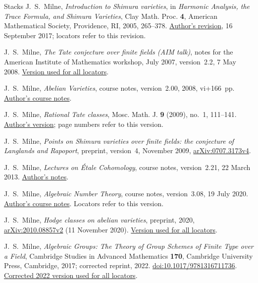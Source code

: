 \begin{thebibliography}{Stacks}
J.~S.~Milne,
\emph{Introduction to Shimura varieties},
in \emph{Harmonic Analysis, the Trace Formula, and Shimura Varieties},
Clay Math. Proc. \textbf{4}, American Mathematical Society,
Providence, RI, 2005, 265--378.
\href{https://www.jmilne.org/math/xnotes/svi.pdf}{Author's revision},
16 September 2017; locators refer to this revision.

J.~S.~Milne,
\emph{The Tate conjecture over finite fields (AIM talk)},
notes for the American Institute of Mathematics workshop, July 2007,
version~2.2, 7 May 2008.
\href{https://www.jmilne.org/math/articles/2007e.pdf}{Version used for all locators}.

J.~S.~Milne,
\emph{Abelian Varieties}, course notes, version~2.00, 2008, vi+166~pp.
\href{https://www.jmilne.org/math/CourseNotes/AVc.pdf}{Author's course notes}.

J.~S.~Milne,
\emph{Rational Tate classes},
Mosc. Math. J. \textbf{9} (2009), no.~1, 111--141.
\href{https://www.jmilne.org/math/articles/2009b.pdf}{Author's version};
page numbers refer to this version.

J.~S.~Milne,
\emph{Points on Shimura varieties over finite fields: the conjecture of
Langlands and Rapoport},
preprint, version~4, November 2009,
\href{https://arxiv.org/abs/0707.3173v4}{arXiv:0707.3173v4}.

J.~S.~Milne,
\emph{Lectures on \'{E}tale Cohomology},
course notes, version~2.21, 22 March 2013.
\href{https://www.jmilne.org/math/CourseNotes/LEC.pdf}{Author's notes}.

J.~S.~Milne,
\emph{Algebraic Number Theory}, course notes, version~3.08, 19 July 2020.
\href{https://www.jmilne.org/math/CourseNotes/ANTc.pdf}{Author's course notes}.
Locators refer to this version.

J.~S.~Milne,
\emph{Hodge classes on abelian varieties},
preprint, 2020,
\href{https://arxiv.org/abs/2010.08857v2}{arXiv:2010.08857v2}
(11 November 2020).
\href{https://arxiv.org/pdf/2010.08857v2}{Version used for all locators}.

J.~S.~Milne,
\emph{Algebraic Groups: The Theory of Group Schemes of Finite Type over a Field},
Cambridge Studies in Advanced Mathematics \textbf{170},
Cambridge University Press, Cambridge, 2017; corrected reprint, 2022.
\href{https://doi.org/10.1017/9781316711736}{doi:10.1017/9781316711736}.
\href{https://www.jmilne.org/math/Books/iAG2022.pdf}{Corrected 2022 version used for all locators}.


\end{thebibliography}
